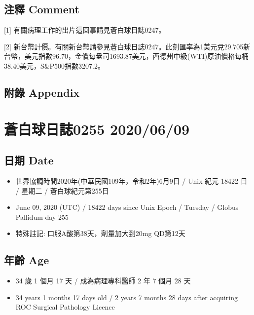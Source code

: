 \documentclass[a5paper, 11pt
]{book}
\providecommand{\tightlist}{%
  \setlength{\itemsep}{0pt}\setlength{\parskip}{0pt}}
\begin{document}
\hypertarget{ux6ce8ux91cb-comment-7}{%
\subsection{注釋 Comment}\label{ux6ce8ux91cb-comment-7}}

{[}1{]} 有關病理工作的出片這回事請見蒼白球日誌0247。

{[}2{]}
新台幣計價。有關新台幣請參見蒼白球日誌0247。此刻匯率為1美元兌29.705新台幣，美元指數96.70，金價每盎司1693.87美元，西德州中級(WTI)原油價格每桶38.40美元，S\&P500指數3207.2。

\hypertarget{ux9644ux9304-appendix-7}{%
\subsection{附錄 Appendix}\label{ux9644ux9304-appendix-7}}

\hypertarget{ux84bcux767dux7403ux65e5ux8a8c0255-20200609}{%
\section{蒼白球日誌0255
2020/06/09}\label{ux84bcux767dux7403ux65e5ux8a8c0255-20200609}}

\hypertarget{ux65e5ux671f-date-8}{%
\subsection{日期 Date}\label{ux65e5ux671f-date-8}}

\begin{itemize}
\tightlist
\item
  世界協調時間2020年(中華民國109年，令和2年)6月9日 / Unix 紀元 18422 日
  / 星期二 / 蒼白球紀元第255日
\item
  June 09, 2020 (UTC) / 18422 days since Unix Epoch / Tuesday / Globus
  Pallidum day 255
\item
  特殊註記: 口服A酸第38天，劑量加大到20mg QD第12天
\end{itemize}

\hypertarget{ux5e74ux9f61-age-8}{%
\subsection{年齡 Age}\label{ux5e74ux9f61-age-8}}

\begin{itemize}
\tightlist
\item
  34 歲 1 個月 17 天 / 成為病理專科醫師 2 年 7 個月 28 天
\item
  34 years 1 months 17 days old / 2 years 7 months 28 days after
  acquiring ROC Surgical Pathology Licence
\end{itemize}
\end{document}
